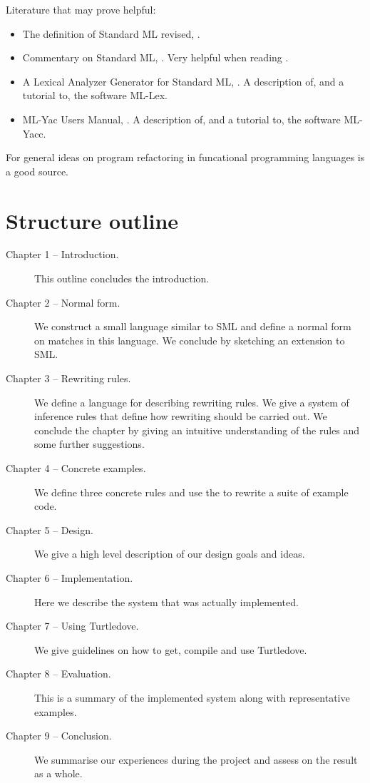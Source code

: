 \noindent
Literature that may prove helpful:

\begin{itemize}
\item The definition of Standard ML revised, \cite{SML97}.
\item Commentary on Standard ML, \cite{SMLCOMM}. Very helpful when reading
  \cite{SML97}.
\item A Lexical Analyzer Generator for Standard ML, \cite{MLLEX, ml-lex-yacc}. A description
  of, and a tutorial to, the software ML-Lex.
\item ML-Yac Users Manual, \cite{MLYACC, ml-lex-yacc}. A description of, and a tutorial to,
  the software ML-Yacc. 
\end{itemize}

For general ideas on program refactoring in funcational programming languages
\cite{HARE} is a good source.

\section{Structure outline}
\begin{description}
\item[Chapter 1 -- Introduction.]
  This outline concludes the introduction.
\item[Chapter 2 -- Normal form.]
  We construct a small language similar to SML and define a normal form on
  matches in this language. We conclude by sketching an extension to SML.
\item[Chapter 3 -- Rewriting rules.]
  We define a language for describing rewriting rules. We give a system of
  inference rules that define how rewriting should be carried out. We conclude
  the chapter by giving an intuitive understanding of the rules and some further
  suggestions.
\item[Chapter 4 -- Concrete examples.]
  We define three concrete rules and use the to rewrite a suite of example
  code.
\item[Chapter 5 -- Design.]
  We give a high level description of our design goals and ideas.
\item[Chapter 6 -- Implementation.]
  Here we describe the system that was actually implemented.
\item[Chapter 7 -- Using Turtledove.]
  We give guidelines on how to get, compile and use Turtledove.
\item[Chapter 8 -- Evaluation.]
  This is a summary of the implemented system along with representative examples.
\item[Chapter 9 -- Conclusion.]
  We summarise our experiences during the project and assess on the result as a
  whole.
\end{description}


